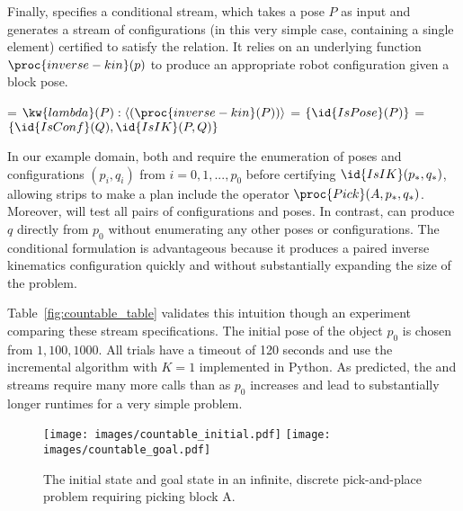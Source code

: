 \documentclass[letterpaper]{article} %
\newcommand\note[1]{\todo[inline, color=blue!10, linecolor=blue!90,
  size=\footnotesize]{\linespread{0.9}\selectfont{{\bf CRG:} #1}\par}}
\theoremstyle{plain}\newtheorem{thm}{Theorem}
\theoremstyle{definition}\newtheorem{defn}{Definition}
\theoremstyle{plain}\newtheorem{lem}{Lemma}
\theoremstyle{plain}\newtheorem{cor}{Corollary}
\newcommand{\strips}{{\sc strips}}
\newcommand{\eager}{incremental}
\begin{document}
Finally,  specifies a conditional stream, which takes a
pose $P$ as input and generates a stream of configurations (in this
very simple case, containing a single element) certified to satisfy
the  relation.  It relies on an underlying function
$\proc{inverse-kin}(p)$ to produce an appropriate robot configuration
given a block pose.

\begin{footnotesize}
\begin{codebox}
\zi {} = $\kw{lambda} (P): \langle (\proc{inverse-kin}(P)) \rangle$
\zi {} = $\{\id{IsPose}(P)\}$
\zi {} = $\{\id{IsConf}(Q), \id{IsIK}(P, Q)\}$
\end{codebox}
\end{footnotesize}

In our example domain, both  and  require the
enumeration of poses and configurations $(p_i, q_i)$ from $i = 0, 1,
..., p_0$ before certifying $\id{IsIK}(p_*, q_*)$, allowing \strips{}
to make a plan include the operator
$\proc{Pick}(A, p_*, q_*)$. Moreover,  will test all pairs
of configurations and poses.  In contrast,   can produce
$q$ directly from $p_0$ without enumerating any other poses or
configurations. The conditional formulation is advantageous
because it produces a paired inverse kinematics configuration quickly
and without substantially expanding the size of the problem. 

Table~\ref{fig:countable_table} validates this intuition though an
experiment comparing these stream specifications.  The initial pose of
the object $p_0$ is chosen from $1, 100, 1000$.  All trials have a timeout of 120 seconds and use the
\eager{} algorithm with $K=1$ implemented in Python.
As predicted, the  and 
streams require many more calls than  as $p_0$ increases
and lead to substantially longer runtimes for a very simple problem.


\begin{figure}[ht]
\centering
\texttt{[image: images/countable\_initial.pdf]}
\texttt{[image: images/countable\_goal.pdf]}
\caption{The initial state and goal state in an infinite, discrete pick-and-place problem requiring picking block A. } 
\label{fig:countable_tamp}
\end{figure}
\end{document}
